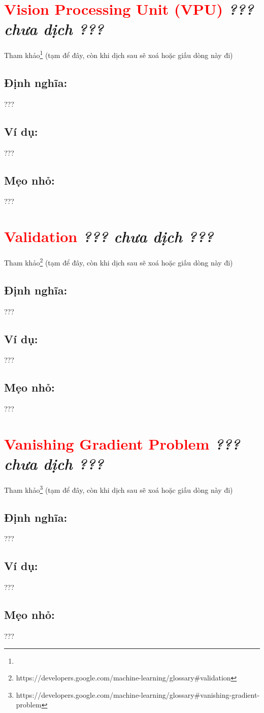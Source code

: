 \section*{\huge \textcolor{Red}{Vision Processing Unit (VPU)}  \small \textit{??? chưa dịch ???} }
Tham khảo\footnote{} (tạm để đây, còn khi dịch sau sẽ xoá hoặc giấu dòng này đi)
\subsection*{Định nghĩa:}
???
\subsection*{Ví dụ:}
???
\subsection*{Mẹo nhỏ:}
???
\section*{\huge \textcolor{Red}{Validation}  \small \textit{??? chưa dịch ???} }
Tham khảo\footnote{https://developers.google.com/machine-learning/glossary\#validation} (tạm để đây, còn khi dịch sau sẽ xoá hoặc giấu dòng này đi)
\subsection*{Định nghĩa:}
???
\subsection*{Ví dụ:}
???
\subsection*{Mẹo nhỏ:}
???
\section*{\huge \textcolor{Red}{Vanishing Gradient Problem}  \small \textit{??? chưa dịch ???} }
Tham khảo\footnote{https://developers.google.com/machine-learning/glossary\#vanishing-gradient-problem} (tạm để đây, còn khi dịch sau sẽ xoá hoặc giấu dòng này đi)
\subsection*{Định nghĩa:}
???
\subsection*{Ví dụ:}
???
\subsection*{Mẹo nhỏ:}
???
